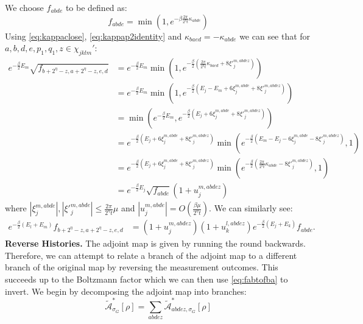 \documentclass[aps,floatfix,10pt,amssymb,amsfont,amsmath,superscriptaddress,float,nofootinbib,longbibliography,nobalancelastpage,twocolumn]{revtex4-2}
\begin{document}
We choose $f_{abde}$ to be defined as:
\begin{equation}
    f_{abde} = \min(1,e^{-\beta\frac{2\pi}{2^{\eta}t}\kappa_{abde}})
\end{equation}
Using \eqref{eq:kappaclose}, \eqref{eq:kappap2identity} and $\kappa_{baed}
= -\kappa_{abde}$ we can see that for $a,b,d,e,p_1,q_1,z \in \chi_{jklm}'$:
\begin{equation}
    \begin{aligned}
    e^{-\frac{\beta}{2}E_m}\sqrt{f_{b+2^{\eta}-z,a+2^{\eta}-z,e,d}} &= e^{-\frac{\beta}{2}E_m}\min(1,e^{-\frac{\beta}{2}(\frac{2\pi}{2^{\eta}t}\kappa_{baed}+ 8\xi'^{m,abdez}_j)})\\
    &= e^{-\frac{\beta}{2}E_m}\min(1,e^{-\frac{\beta}{2}(E_j-E_m + 6\xi^{m,abde}_j+ 8\xi'^{m,abdez}_j)})\\
    &= \min\!\left(e^{-\frac{\beta}{2}E_m}, e^{-\frac{\beta}{2}(E_j + 6\xi^{m,abde}_j+ 8\xi'^{m,abdez}_j)}\right)\\
    &= e^{-\frac{\beta}{2}(E_j+ 6\xi^{m,abde}_j+ 8\xi'^{m,abdez}_j)} \min(e^{-\frac{\beta}{2}(E_m-E_j-6\xi^{m,abde}_j- 8\xi'^{m,abdez}_j)},1)\\
     &= e^{-\frac{\beta}{2}(E_j+ 6\xi^{m,abde}_j+ 8\xi'^{m,abdez}_j)} \min(e^{-\frac{\beta}{2}(\frac{2\pi}{2^{\eta}t}\kappa_{abde}- 8\xi'^{m,abdez}_j)},1)\\
    &= e^{-\frac{\beta}{2}E_j}\sqrt{f_{abde}}(1+u^{m,abdez}_j)
\end{aligned}
\end{equation}
where $|\xi^{m,abde}_j|,|\xi'^{m,abde}_j| \leq \frac{2\pi}{2^{\eta}t}\mu$
and $|u^{m,abde}_j| = O(\frac{\beta \mu}{2^{\eta}t})$. We can similarly see:
\begin{equation}
\begin{aligned}
e^{-\frac{\beta}{2}(E_l+E_m)}f_{b+2^{\eta}-z,a+2^{\eta}-z,e,d}
&=(1+u_j^{m,abdez})(1+u_k^{l,abdez})e^{-\frac{\beta}{2}(E_j+E_k)}f_{abde}.
\end{aligned}
\label{eq:fabtofba}
\end{equation}
\textbf{Reverse Histories.} The adjoint map is given by running the round backwards. Therefore, we can attempt to relate a branch of the adjoint map to a different branch  of the original map by reversing the measurement outcomes. This succeeds up to the Boltzmann factor which we can then use \eqref{eq:fabtofba} to invert. We begin by decomposing the adjoint map into branches:
\begin{equation}
    \tilde{\mathcal{A}}^*_{\sigma_G}[\rho] =  \sum_{abdez}\tilde{\mathcal{A}}^*_{abdez,\sigma_G}[\rho]
\end{equation}
\end{document}
